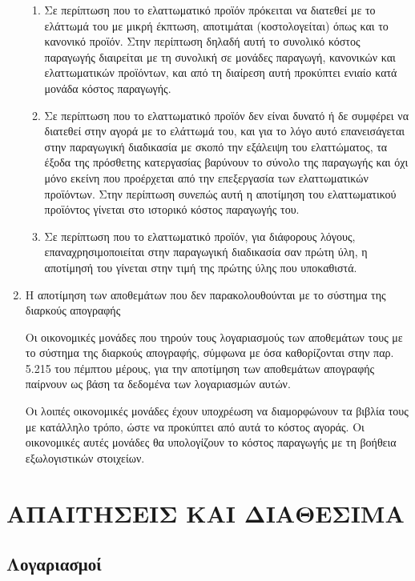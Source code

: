 \documentclass[A4,10pt,greek]{book}
\begin{document}
\begin{enumerate}
\begin{enumerate}
\item Σε περίπτωση που το ελαττωματικό προϊόν πρόκειται να διατεθεί με το ελάττωμά του με μικρή έκπτωση, αποτιμάται (κοστολογείται) όπως και το κανονικό προϊόν. Στην περίπτωση δηλαδή αυτή το συνολικό κόστος παραγωγής διαιρείται με τη συνολική σε μονάδες παραγωγή, κανονικών και ελαττωματικών προϊόντων, και από τη διαίρεση αυτή προκύπτει ενιαίο κατά μονάδα κόστος παραγωγής.

\item Σε περίπτωση που το ελαττωματικό προϊόν δεν είναι δυνατό ή δε συμφέρει να διατεθεί στην αγορά με το ελάττωμά του, και για το λόγο αυτό επανεισάγεται στην παραγωγική διαδικασία με σκοπό την εξάλειψη του ελαττώματος, τα έξοδα της πρόσθετης κατεργασίας βαρύνουν το σύνολο της παραγωγής και όχι μόνο εκείνη που προέρχεται από την επεξεργασία των ελαττωματικών προϊόντων. Στην περίπτωση συνεπώς αυτή η αποτίμηση του ελαττωματικού προϊόντος γίνεται στο ιστορικό κόστος παραγωγής του. 

\item Σε περίπτωση που το ελαττωματικό προϊόν, για διάφορους λόγους, επαναχρησιμοποιείται στην παραγωγική διαδικασία σαν πρώτη ύλη, η αποτίμησή του γίνεται στην τιμή της πρώτης ύλης που υποκαθιστά.

\end{enumerate}

\item Η αποτίμηση των αποθεμάτων που δεν παρακολουθούνται με το σύστημα της διαρκούς απογραφής


Οι οικονομικές μονάδες που τηρούν τους λογαριασμούς των αποθεμάτων τους με το σύστημα της διαρκούς απογραφής, σύμφωνα με όσα καθορίζονται στην παρ. 5.215 του πέμπτου μέρους, για την αποτίμηση των αποθεμάτων απογραφής παίρνουν ως βάση τα δεδομένα των λογαριασμών αυτών.

Οι λοιπές οικονομικές μονάδες έχουν υποχρέωση να διαμορφώνουν τα βιβλία τους με κατάλληλο τρόπο, ώστε να προκύπτει από αυτά το κόστος αγοράς. Οι οικονομικές αυτές μονάδες θα υπολογίζουν το κόστος παραγωγής με τη βοήθεια εξωλογιστικών στοιχείων.

\end{enumerate}

\chapter{ΑΠΑΙΤΗΣΕΙΣ ΚΑΙ ΔΙΑΘΕΣΙΜΑ}

\section{Λογαριασμοί}
\end{document}
